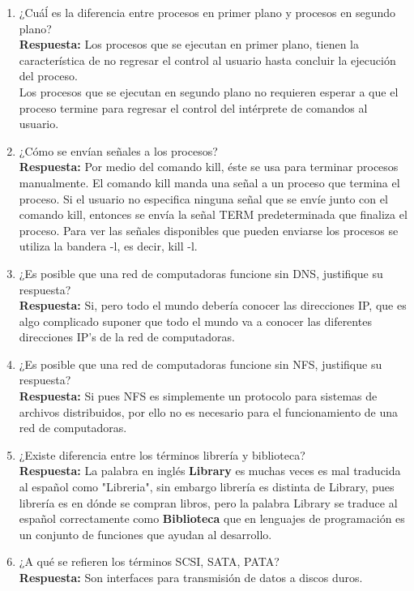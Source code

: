 \documentclass[a4paper, 11pt, oneside]{article}
\begin{document}
\begin{enumerate}
    \item ¿Cuáĺ es la diferencia entre procesos en primer plano y procesos en segundo plano?\\
    \textbf{Respuesta:}
    Los procesos que se ejecutan en primer plano, tienen la característica de no regresar el control al usuario hasta concluir la ejecución del proceso.\\
    Los procesos que se ejecutan en segundo plano no requieren esperar a que el proceso termine para regresar el control del intérprete de comandos al usuario.
    \item ¿Cómo se envían señales a los procesos?\\
    \textbf{Respuesta:} Por medio del comando kill, éste se usa para terminar procesos manualmente. El comando kill manda una señal a un proceso que termina el proceso. Si el usuario no especifica ninguna señal que se envíe junto con el comando kill, entonces se envía la señal TERM predeterminada que finaliza el proceso. Para ver las señales disponibles que pueden enviarse  los procesos se utiliza la bandera -l, es decir, kill -l. 

    \item ¿Es posible que una red de computadoras funcione sin DNS, justifique su
    respuesta?\\
    \textbf{Respuesta:} Si, pero todo el mundo debería conocer las direcciones IP, que es algo complicado suponer que todo el mundo va a conocer las diferentes direcciones IP's de la red de computadoras.
    \item ¿Es posible que una red de computadoras funcione sin NFS, justifique su
    respuesta?\\
    \textbf{Respuesta:} Si pues NFS es simplemente un protocolo para sistemas de archivos distribuidos, por ello no es necesario para el funcionamiento de una red de computadoras.
    \item ¿Existe diferencia entre los términos librería y biblioteca?\\
    \textbf{Respuesta:} La palabra en inglés \textbf{Library} es muchas veces es mal traducida al español como "Libreria", sin embargo librería es distinta de Library, pues librería es en dónde se compran libros, pero la palabra Library se traduce al español correctamente como \textbf{Biblioteca} que en lenguajes de programación es un conjunto de funciones que ayudan al desarrollo.
    
    \item ¿A qué se refieren los términos SCSI, SATA, PATA?\\
    \textbf{Respuesta:} Son interfaces para transmisión de datos a discos duros.
    

\end{enumerate}
\end{document}
